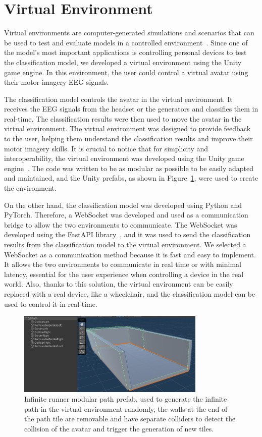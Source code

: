 \section{Virtual Environment}
Virtual environments are computer-generated simulations and scenarios that can be used to test and evaluate models in a controlled environment~\cite{ellis1994virtual}.
Since one of the model's most important applications is controlling personal devices to test the classification model, we developed a virtual environment using the Unity game engine. In this environment, the user could control a virtual avatar using their motor imagery EEG signals.

The classification model controls the avatar in the virtual environment. It receives the EEG signals from the headset or the generators and classifies them in real-time.
The classification results were then used to move the avatar in the virtual environment.
The virtual environment was designed to provide feedback to the user, helping them understand the classification results and improve their motor imagery skills.
It is crucial to notice that for simplicity and interoperability, the virtual environment was developed using the Unity game engine~\cite{haas2014history}.
The code was written to be as modular as possible to be easily adapted and maintained, and the Unity prefabs, as shown in Figure~\ref{fig:path_prefab}, were used to create the environment.

On the other hand, the classification model was developed using Python and PyTorch.
Therefore, a WebSocket was developed and used as a communication bridge to allow the two environments to communicate.
The WebSocket was developed using the FastAPI library~\cite{noauthor_tiangolofastapi_nodate}, and it was used to send the classification results from the classification model to the virtual environment.
We selected a WebSocket as a communication method because it is fast and easy to implement. It allows the two environments to communicate in real time or with minimal latency, essential for the user experience when controlling a device in the real world.
Also, thanks to this solution, the virtual environment can be easily replaced with a real device, like a wheelchair, and the classification model can be used to control it in real-time.
\begin{figure}
    \centering
    \includegraphics[width=0.8\textwidth]{Figures/Approach/path_prefab}
    \caption{Infinite runner modular path prefab, used to generate the infinite path in the virtual environment randomly, the walls at the end of the path tile are removable and have separate colliders to detect the collision of the avatar and trigger the generation of new tiles.}\label{fig:path_prefab}
\end{figure}

